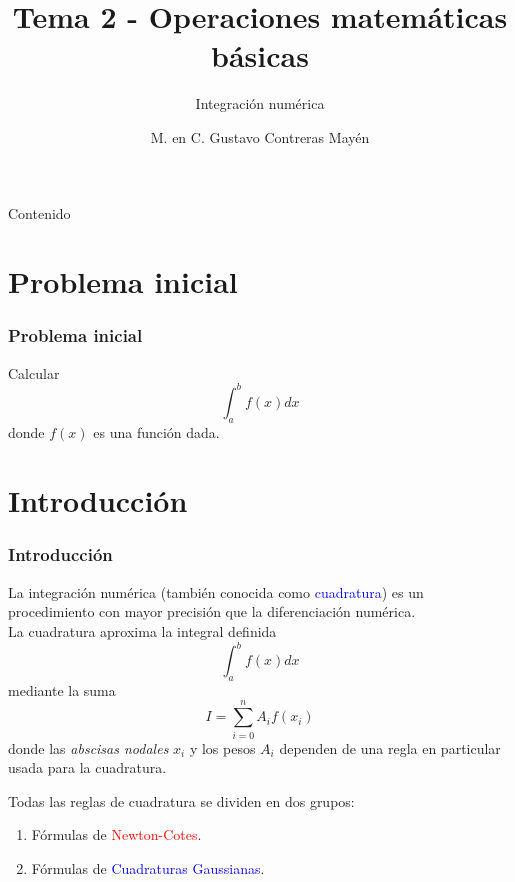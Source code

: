 


\title{Tema 2 - Operaciones matem\'{a}ticas b\'{a}sicas}
\subtitle{Integraci\'{o}n num\'{e}rica}
\author{M. en C. Gustavo Contreras May\'{e}n}
\maketitle
\fontsize{14}{14}\selectfont
{}
\begin{frame}{Contenido}
\tableofcontents[pausesections]
\end{frame}
\section{Problema inicial}
\begin{frame}
\frametitle{Problema inicial}
Calcular
\[\int_{a}^{b} f(x) dx\]
donde $f(x)$ es una funci\'{o}n dada.
\end{frame}
\section{Introducci\'{o}n}
\begin{frame}
\frametitle{Introducci\'{o}n}
La integraci\'{o}n num\'{e}rica (tambi\'{e}n conocida como \textcolor{blue}{cuadratura}) es un procedimiento con mayor precisi\'{o}n que la diferenciaci\'{o}n num\'{e}rica.
\\
\bigskip
La cuadratura aproxima la integral definida
\[\int_{a}^{b} f(x) dx\]
mediante la suma
\[ I = \sum_{i=0}^{n} A_{i}f(x_{i})\]
\fontsize{12}{12}\selectfont
donde las \textit{abscisas nodales} $x_{i}$ y los pesos $A_{i}$ dependen de una regla en particular usada para la cuadratura.
\end{frame}
\begin{frame}
Todas las reglas de cuadratura se dividen en dos grupos:
	\begin{enumerate}
		\item F\'{o}rmulas de \textcolor{red}{Newton-Cotes}.
		\item F\'{o}rmulas de \textcolor{blue}{Cuadraturas Gaussianas}.
	\end{enumerate}
\end{frame}
